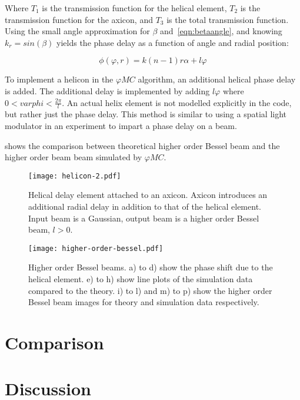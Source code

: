 Where $T_1$ is the transmission function for the helical element, $T_2$ is the transmission function for the axicon, and $T_3$ is the total transmission function.
Using the small angle approximation  for $\beta$ and~\cref{eqn:betaangle}, and knowing $k_r=sin\left(\beta\right)$ yields the phase delay as a function of angle and radial position:

\begin{equation}
\phi(\varphi,r)=k(n-1)r\alpha+l\varphi
\end{equation}

To implement a helicon in the $\varphi MC$ algorithm, an additional helical phase delay is added.
The additional delay is implemented by adding $l\varphi$ where $0<varphi<\tfrac{2\pi}{l}$.
An actual helix element is not modelled explicitly in the code, but rather just the phase delay.
This method is similar to using a spatial light modulator in an experiment to impart a phase delay on a beam.

 shows the comparison between theoretical higher order Bessel beam and the higher order beam beam simulated by $\varphi MC$.

\begin{figure}[!ht]
    \centering
    \texttt{[image: helicon-2.pdf]}
    \caption{Helical delay element attached to an axicon. Axicon introduces an additional radial delay in addition to that of the helical element. Input beam is a Gaussian, output beam is a higher order Bessel beam, $l>0$.}
    \label{fig:helix-2}
    \vspace{-10pt}
\end{figure}

\begin{figure}[!ht]
    \centering
    \texttt{[image: higher-order-bessel.pdf]}
    \caption{Higher order Bessel beams. a) to d) show the phase shift due to the helical element. e) to h) show line plots of the simulation data compared to the theory. i) to l) and m) to p) show the higher order Bessel beam images for theory and simulation data respectively.}
    \label{fig:highordershow}
\end{figure}

\FloatBarrier
\section{Comparison}

\section{Discussion}

